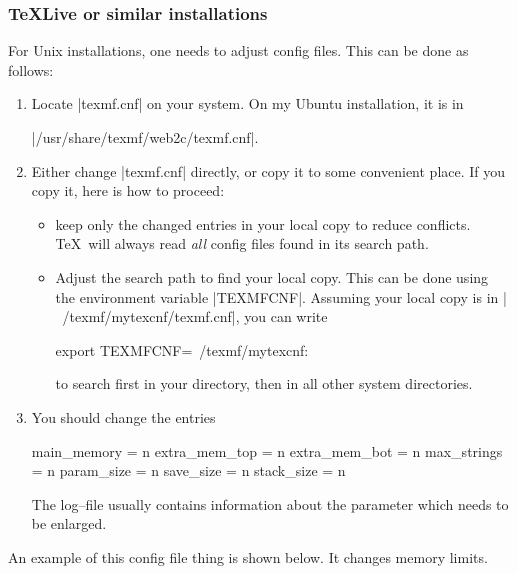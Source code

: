 \subsubsection{\TeX Live or similar installations}
For Unix installations, one needs to adjust config files. This can be done as follows:
\begin{enumerate}
	\item Locate |texmf.cnf| on your system. On my Ubuntu installation, it is in 
	
	|/usr/share/texmf/web2c/texmf.cnf|.
	\item Either change |texmf.cnf| directly, or copy it to some convenient place. If you copy it, here is how to proceed:
		\begin{itemize}
			\item keep only the changed entries in your local copy to reduce conflicts. \TeX\ will always read \emph{all} config files found in its search path.
			\item Adjust the search path to find your local copy. This can be done using the environment variable |TEXMFCNF|. Assuming your local copy is in |~/texmf/mytexcnf/texmf.cnf|, you can write
\begin{codeexample}
export TEXMFCNF=~/texmf/mytexcnf:
\end{codeexample}
			to search first in your directory, then in all other system directories.
		\end{itemize}
	\item You should change the entries
\begin{codeexample}
main_memory = n
extra_mem_top = n
extra_mem_bot = n
max_strings = n
param_size = n
save_size = n
stack_size = n
\end{codeexample}
		The log--file usually contains information about the parameter which needs to be enlarged.
\end{enumerate}
An example of this config file thing is shown below. It changes memory limits.
